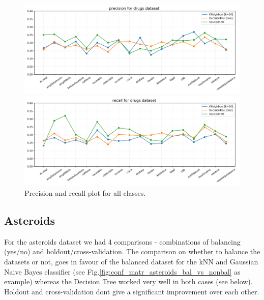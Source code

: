\documentclass{article}
\begin{document}
\begin{figure}[H]
	\centering
	\begin{minipage}[b]{0.8\textwidth}
		\includegraphics[width=1.1\textwidth]{Plots/precision_comparison_drugs.png}
	\end{minipage}
	\begin{minipage}[b]{0.8\textwidth}
		\includegraphics[width=1.1\textwidth]{Plots/recall_comparison_drugs.png}
	\end{minipage}
	\caption{Precision and recall plot for all classes.}
	\label{fig:drugs_comparison}
\end{figure}








\subsection{Asteroids}

For the asteroids dataset we had 4 comparisons - combinations of balancing (yes/no) and holdout/cross-validation. The comparison on whether to balance the datasets or not, goes in favour of the balanced dataset for the kNN and Gaussian Naive Bayes classifier (see Fig.\ref{fig:conf_matr_asteroids_bal_vs_nonbal} as example) whereas the Decision Tree worked very well in both cases (see below). Holdout and cross-validation dont give a significant improvement over each other. \\
\end{document}
